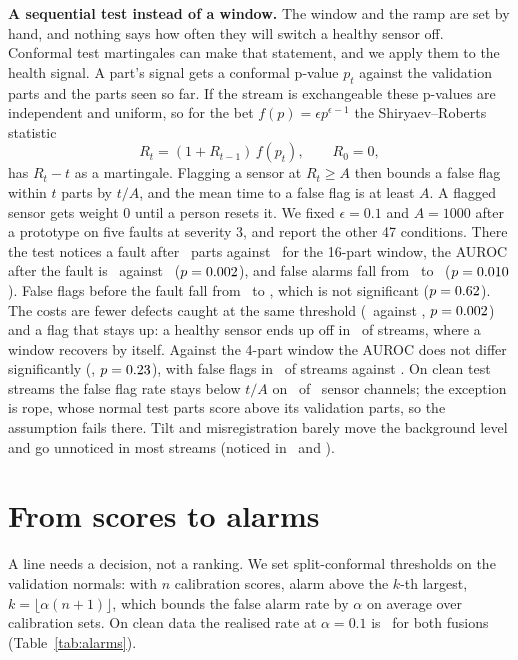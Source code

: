 \documentclass[10pt,twocolumn,letterpaper]{article}
\begin{document}
\textbf{A sequential test instead of a window.} The window and the ramp are set by hand, and nothing says how often they will switch a healthy sensor off. Conformal test martingales \citep{vovk2003testing,volkhonskiy2017inductive,vovk2021retrain} can make that statement, and we apply them to the health signal. A part's signal gets a conformal p-value $p_t$ against the validation parts and the parts seen so far. If the stream is exchangeable these p-values are independent and uniform, so for the bet $f(p) = \epsilon p^{\epsilon - 1}$ the Shiryaev--Roberts statistic \citep{shiryaev1963optimum,roberts1966comparison}
\begin{equation}
R_t = (1 + R_{t-1})\, f(p_t), \qquad R_0 = 0,
\end{equation}
has $R_t - t$ as a martingale. Flagging a sensor at $R_t \geq A$ then bounds a false flag within $t$ parts by $t/A$, and the mean time to a false flag is at least $A$. A flagged sensor gets weight 0 until a person resets it. We fixed $\epsilon = 0.1$ and $A = 1000$ after a prototype on five faults at severity 3, and report the other 47 conditions. There the test notices a fault after \seqDelay\ parts against \seqWindowDelay\ for the 16-part window, the AUROC after the fault is \seqAfter\ against \seqWindowAfter\ ($p=0.002$), and false alarms fall from \seqWindowAlarm\ to \seqAlarm\ ($p=0.010$). False flags before the fault fall from \seqWindowFlag\ to \seqFlag, which is not significant ($p=0.62$). The costs are fewer defects caught at the same threshold (\seqCaught\ against \seqWindowCaught, $p=0.002$) and a flag that stays up: a healthy sensor ends up off in \seqHealthyOff\ of streams, where a window recovers by itself. Against the 4-part window the AUROC does not differ significantly (\seqFourAfter, $p=0.23$), with false flags in \seqFlag\ of streams against \seqFourFlag. On clean test streams the false flag rate stays below $t/A$ on \seqBoundOk\ of \seqBoundAll\ sensor channels; the exception is rope, whose normal test parts score above its validation parts, so the assumption fails there. Tilt and misregistration barely move the background level and go unnoticed in most streams (noticed in \seqTilt\ and \seqMisregister).

\section{From scores to alarms}
\label{sec:alarms}

A line needs a decision, not a ranking. We set split-conformal thresholds on the validation normals: with $n$ calibration scores, alarm above the $k$-th largest, $k = \lfloor \alpha (n+1) \rfloor$, which bounds the false alarm rate by $\alpha$ on average over calibration sets. On clean data the realised rate at $\alpha = 0.1$ is \cleanFalse\ for both fusions (Table~\ref{tab:alarms}).
\end{document}
